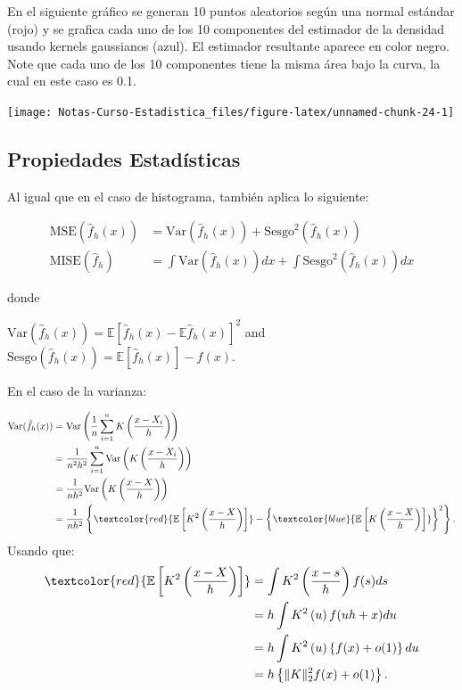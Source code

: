 \documentclass[
  12pt,
]{book}
\begin{document}
En el siguiente gráfico se generan 10 puntos aleatorios según una normal
estándar (rojo) y se grafica cada uno de los 10 componentes del
estimador de la densidad usando kernels gaussianos (azul). El estimador
resultante aparece en color negro. Note que cada uno de los 10
componentes tiene la misma área bajo la curva, la cual en este caso es
0.1.

\begin{center}\texttt{[image: Notas-Curso-Estadistica\_files/figure-latex/unnamed-chunk-24-1]} \end{center}

\hypertarget{propiedades-estaduxedsticas-2}{%
\subsection{Propiedades
Estadísticas}\label{propiedades-estaduxedsticas-2}}

Al igual que en el caso de histograma, también aplica lo siguiente:

\begin{align*}
\mathrm{MSE}(\hat{f}_{h}(x)) & =\mathrm{Var}(\hat{f}_{h}(x))+\mathrm{Sesgo}^{2} (\hat{f}_{h}(x))            \\
\mathrm{MISE}(\hat{f}_{h})   & =\int\mathrm{Var}(\hat{f}_{h}(x))dx+\int\mathrm{Sesgo}^{2}(\hat{f}_{h}(x))dx
\end{align*}

donde

\(\mathrm{Var}\left(\hat{f}_{h}(x)\right)=\mathbb{E}\left[\hat{f}_{h}(x)-\mathbb{E}\hat{f}_{h}(x)\right]^{2}\)
and
\(\mathrm{Sesgo}\left(\hat{f}_{h}(x)\right)=\mathbb{E}\left[\hat{f}_{h}(x)\right]-f(x)\).

En el caso de la varianza:

\begin{align*}
\mathrm{Var}(\hat{f}_{h}(x))
& =\mathrm{Var}\left(\frac{1}{n}\sum_{i=1}^{n}K\left(\frac{x-X_{i}}{h}\right)\right)          \\
& =\frac{1}{n^{2}h^{2}}\sum_{i=1}^{n}\mathrm{Var}\left(K\left(\frac{x-X_{i}}{h}\right)\right) \\
& =\frac{1}{nh^{2}}\mathrm{Var}\left(K\left(\frac{x-X}{h}\right)\right)                       \\
& =\frac{1}{nh^{2}}\left\{
\textcolor{red}{\mathbb{E}\left[K^{2}\left(\frac{x-X}{h}\right)\right]}
-\left\{
\textcolor{blue}{\mathbb{E}\left[K\left(\frac{x-X}{h}\right)\right]}
\right\}^{2}
\right\}.
\end{align*} Usando que: \begin{align*}
\textcolor{red}{\mathbb{E}\left[K^{2}\left(\frac{x-X}{h}\right)\right]}
& =\int K^{2}\left(\frac{x-s}{h}\right)f(s)ds            \\
& =h\int K^{2}\left(u\right)f(uh+x)du                    \\
& =h\int K^{2}\left(u\right)\left\{ f(x)+o(1)\right\} du \\
& =h\left\{ \Vert K\Vert_{2}^{2}f(x)+o(1)\right\} .
\end{align*}
\end{document}
